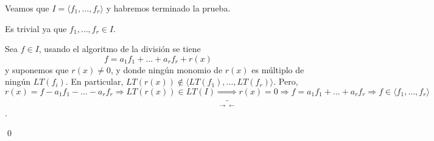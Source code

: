 \documentclass{article}
\begin{document}
Veamos que $I= \langle f_1,\dots, f_r \rangle $ y habremos terminado la prueba.

\framebox{$\supseteq $} Es trivial ya que $f_1,\dots,f_r\in I$.

\framebox{$\subseteq $} Sea $f\in I$, usando el algoritmo de la división se tiene
$$ f=a_1f_1+\dots+a_rf_r+r(x)$$
y suponemos que $r(x)\neq 0$, y donde ningún monomio de $r(x)$ es múltiplo de ningún $LT(f_i)$. En particular, $LT(r(x))\not \in \langle LT(f_1),\dots,LT(f_r)\rangle $. Pero, $r(x)=f-a_1f_1-\dots - a_rf_r\Rightarrow LT(r(x))\in LT(I) \underbrace{\Rightarrow}_{\rightarrow \leftarrow}r(x)=0 \Rightarrow f=a_1f_1+\dots +a_rf_r  \Rightarrow f\in \langle f_1,\dots, f_r \rangle $. 

\qed
\end{document}

